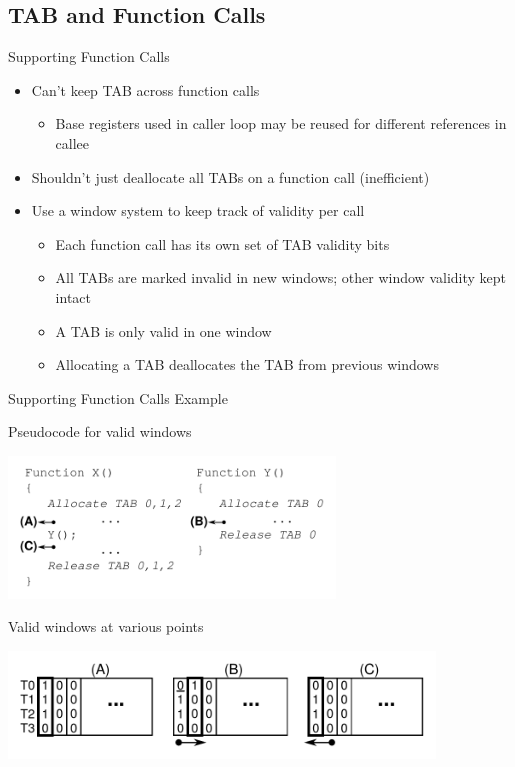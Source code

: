 \documentclass{beamer}
\begin{document}
\subsection{TAB and Function Calls}
\begin{frame}{Supporting Function Calls}
   \begin{itemize}
      \item Can't keep TAB across function calls
         \begin{itemize}
            \item Base registers used in caller loop may be reused for 
               different references in callee
         \end{itemize}
      \item Shouldn't just deallocate all TABs on a function call (inefficient)
      \item Use a window system to keep track of validity per call
         \begin{itemize}
            \item Each function call has its own set of TAB validity bits
            \item All TABs are marked invalid in new windows; other window
               validity kept intact
            \item A TAB is only valid in one window
            \item Allocating a TAB deallocates the TAB from previous windows
         \end{itemize}
   \end{itemize}
\end{frame}
\begin{frame}{Supporting Function Calls Example}
   \begin{block}{Pseudocode for valid windows}
      \begin{center}
         \includegraphics[width=0.65\textwidth]{figures/validexample1-1.pdf}
      \end{center}
   \end{block}
   \begin{block}{Valid windows at various points}
      \begin{center}
         \includegraphics[width=0.85\textwidth]{figures/validexample1-2.pdf}
      \end{center}
   \end{block}
\end{frame}
\end{document}
